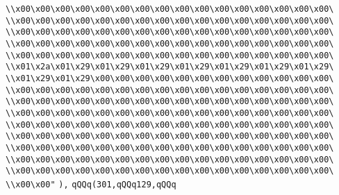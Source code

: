 \verb|\\x00\x00\x00\x00\x00\x00\x00\x00\x00\x00\x00\x00\x00\x00\x00\x00\|\newline
\verb|\\x00\x00\x00\x00\x00\x00\x00\x00\x00\x00\x00\x00\x00\x00\x00\x00\|\newline
\verb|\\x00\x00\x00\x00\x00\x00\x00\x00\x00\x00\x00\x00\x00\x00\x00\x00\|\newline
\verb|\\x00\x00\x00\x00\x00\x00\x00\x00\x00\x00\x00\x00\x00\x00\x00\x00\|\newline
\verb|\\x00\x00\x00\x00\x00\x00\x00\x00\x00\x00\x00\x00\x00\x00\x00\x00\|\newline
\verb|\\x01\x2a\x01\x29\x01\x29\x01\x29\x01\x29\x01\x29\x01\x29\x01\x29\|\newline
\verb|\\x01\x29\x01\x29\x00\x00\x00\x00\x00\x00\x00\x00\x00\x00\x00\x00\|\newline
\verb|\\x00\x00\x00\x00\x00\x00\x00\x00\x00\x00\x00\x00\x00\x00\x00\x00\|\newline
\verb|\\x00\x00\x00\x00\x00\x00\x00\x00\x00\x00\x00\x00\x00\x00\x00\x00\|\newline
\verb|\\x00\x00\x00\x00\x00\x00\x00\x00\x00\x00\x00\x00\x00\x00\x00\x00\|\newline
\verb|\\x00\x00\x00\x00\x00\x00\x00\x00\x00\x00\x00\x00\x00\x00\x00\x00\|\newline
\verb|\\x00\x00\x00\x00\x00\x00\x00\x00\x00\x00\x00\x00\x00\x00\x00\x00\|\newline
\verb|\\x00\x00\x00\x00\x00\x00\x00\x00\x00\x00\x00\x00\x00\x00\x00\x00\|\newline
\verb|\\x00\x00\x00\x00\x00\x00\x00\x00\x00\x00\x00\x00\x00\x00\x00\x00\|\newline
\verb|\\x00\x00\x00\x00\x00\x00\x00\x00\x00\x00\x00\x00\x00\x00\x00\x00\|\newline
\verb|\\x00\x00"|\newline
\verb|),|\newline
\verb|qQQq(301,qQQq129,qQQq|\newline
